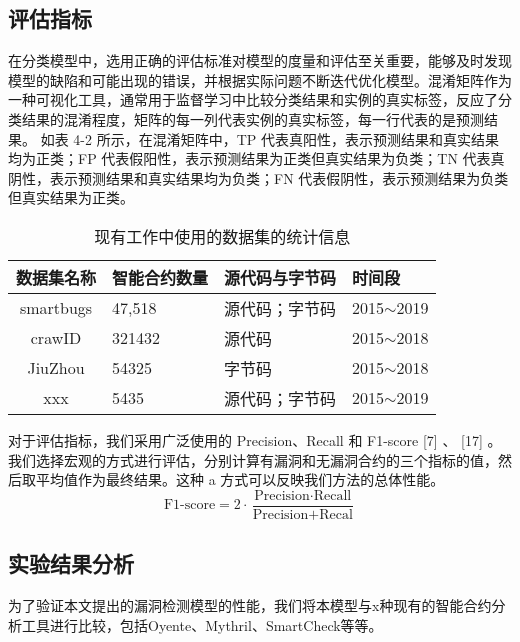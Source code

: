 \subsection{评估指标}
\label{sec:评估指标}
在分类模型中，选用正确的评估标准对模型的度量和评估至关重要，能够及时发现模型的缺陷和可能出现的错误，并根据实际问题不断迭代优化模型。混淆矩阵作为一种可视化工具，通常用于监督学习中比较分类结果和实例的真实标签，反应了分类结果的混淆程度，矩阵的每一列代表实例的真实标签，每一行代表的是预测结果。 如表 4-2 所示，在混淆矩阵中，TP 代表真阳性，表示预测结果和真实结果均为正类；FP 代表假阳性，表示预测结果为正类但真实结果为负类；TN 代表真阴性，表示预测结果和真实结果均为负类；FN 代表假阴性，表示预测结果为负类但真实结果为正类。 
\begin{table}[htbp]
    \caption{\label{tab:confusion_matrix}现有工作中使用的数据集的统计信息}
    \small
    \renewcommand{\arraystretch}{1.5}
    \begin{tabularx}{\linewidth}{cX<{\centering}X<{\centering}X<{\centering}}
        \hline
    数据集名称     & 智能合约数量 & 源代码与字节码 & 时间段            \\ \hline
    smartbugs & 47,518  & 源代码；字节码 & 2015$\sim$2019 \\
    crawID    & 321432 & 源代码     & 2015$\sim$2018 \\
    JiuZhou   & 54325  & 字节码     & 2015$\sim$2018 \\
    xxx       & 5435   & 源代码；字节码 & 2015$\sim$2019  \\  \hline
    \end{tabularx}
\end{table}
对于评估指标，我们采用广泛使用的 Precision、Recall 和 F1-score [7] 、 [17] 。我们选择宏观的方式进行评估，分别计算有漏洞和无漏洞合约的三个指标的值，然后取平均值作为最终结果。这种 a 方式可以反映我们方法的总体性能。
\begin{equation}
\text{F1-score}=2\cdot\frac{\text{Precision}\cdot\text{Recall}}{\text{Precision}+\text{Recal}} \label{f1-score}
\end{equation}
\subsection{实验结果分析}
\label{sec:实验结果分析}
为了验证本文提出的漏洞检测模型的性能，我们将本模型与x种现有的智能合约分析工具进行比较，包括Oyente、Mythril、SmartCheck等等。

